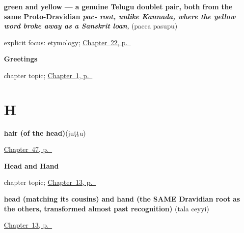 \noindent\begin{minipage}[t]{\linewidth}
\raggedright
\textbf{green and yellow — a genuine Telugu doublet pair, both from the same Proto-Dravidian \emph{pac- root, unlike Kannada, where the yellow word broke away as a Sanskrit loan}}\enspace\emph{, }\enspace(pacca pasupu)\par
\footnotesize explicit focus: etymology; \hyperref[ch:te-green-and-yellow]{Chapter~22, p.~\pageref*{ch:te-green-and-yellow}}
\end{minipage}\par\smallskip

\noindent\begin{minipage}[t]{\linewidth}
\raggedright
\textbf{Greetings}\par
\footnotesize chapter topic; \hyperref[ch:greetings]{Chapter~1, p.~\pageref*{ch:greetings}}
\end{minipage}\par\smallskip

\section*{H}

\noindent\begin{minipage}[t]{\linewidth}
\raggedright
\textbf{hair (of the head)}\enspace\emph{}\enspace(juṭṭu)\par
\footnotesize \hyperref[ch:te-body-more]{Chapter~47, p.~\pageref*{ch:te-body-more}}
\end{minipage}\par\smallskip

\noindent\begin{minipage}[t]{\linewidth}
\raggedright
\textbf{Head and Hand}\par
\footnotesize chapter topic; \hyperref[ch:te-head-and-hand]{Chapter~13, p.~\pageref*{ch:te-head-and-hand}}
\end{minipage}\par\smallskip

\noindent\begin{minipage}[t]{\linewidth}
\raggedright
\textbf{head (matching its cousins) and hand (the SAME Dravidian root as the others, transformed almost past recognition)}\enspace\emph{ }\enspace(tala ceyyi)\par
\footnotesize \hyperref[ch:te-head-and-hand]{Chapter~13, p.~\pageref*{ch:te-head-and-hand}}
\end{minipage}\par\smallskip

